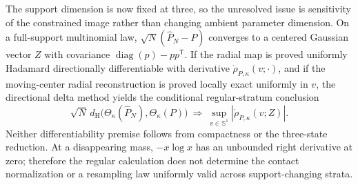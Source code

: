 The support dimension is now fixed at three, so the unresolved issue is sensitivity of the constrained image rather than changing ambient parameter dimension.  On a full-support multinomial law, \(\sqrt N(\widehat P_N-P)\) converges to a centered Gaussian vector \(Z\) with covariance \(\operatorname{diag}(p)-pp^{\mathsf T}\).  If the radial map is proved uniformly Hadamard directionally differentiable with derivative \(\dot\rho_{P,\kappa}(v;\cdot)\), and if the moving-center radial reconstruction is proved locally exact uniformly in \(v\), the directional delta method yields the conditional regular-stratum conclusion
\[
\sqrt N\,d_{\mathrm H}\bigl(\Theta_\kappa(\widehat P_N),\Theta_\kappa(P)\bigr)
\ \Longrightarrow\ 
\sup_{v\in\mathbb S^1}\left|\dot\rho_{P,\kappa}(v;Z)\right|.
\]
Neither differentiability premise follows from compactness or the three-state reduction.  At a disappearing mass, \(-x\log x\) has an unbounded right derivative at zero; therefore the regular calculation does not determine the contact normalization or a resampling law uniformly valid across support-changing strata.